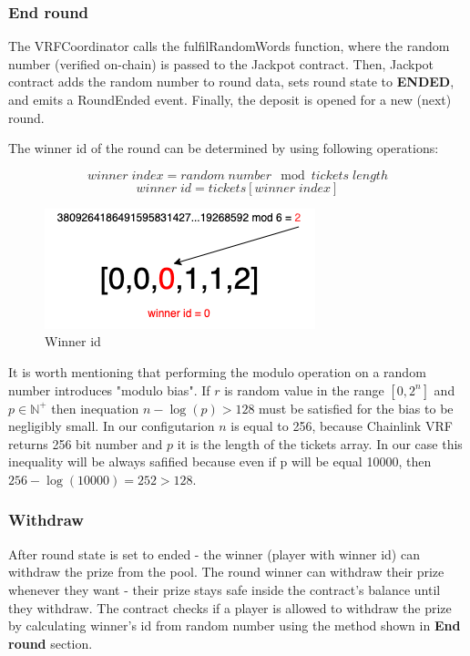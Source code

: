 \documentclass[12pt]{article}
\begin{document}
\subsubsection{End round}
The VRFCoordinator calls the fulfilRandomWords function, where the random number (verified on-chain) is passed to the Jackpot contract. Then, Jackpot contract adds the random number to round data, sets round state to \textbf{ENDED}, and emits a RoundEnded event. Finally, the deposit is opened for a new (next) round.

The winner id of the round can be determined by using following operations:

\[ winner\;index = random\;number\mod tickets\;length \]
\[ winner\;id = tickets[winner\;index] \]

\begin{figure}[!ht]
    \centering
    \includegraphics[scale=0.8]{images/winnerId.png} 
    \caption{Winner id}
    \label{fig:b1}
\end{figure}
\FloatBarrier

It is worth mentioning that performing the modulo operation on a random number introduces "modulo bias"\cite{modulobias}. If \(r\) is random value in the range \([0, 2^{n}]\) and \(p \in \mathbb{N}^{+}\) then inequation \(n - \log(p) > 128 \) must be satisfied for the bias to be negligibly small. In our configutarion \(n\) is equal to 256, because Chainlink VRF returns 256 bit number and \(p\) it is the length of the tickets array. 
In our case this inequality will be always safified because even if p will be equal 10000, then \(256 - \log(10000) = 252 > 128 \).

\subsubsection{Withdraw}
After round state is set to ended - the winner (player with winner id) can withdraw the prize from the pool. The round winner can withdraw their prize whenever they want - their prize stays safe inside the contract's balance until they withdraw. The contract checks if a player is allowed to withdraw the prize by calculating winner's id from random number using the method shown in \textbf{End round} section.
\end{document}
